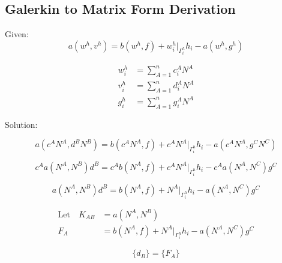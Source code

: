 \documentclass[a4paper, 12pt]{article}
\begin{document}
\newpage
\subsection{Galerkin to Matrix Form Derivation} \label{sec:MatrixDer}

Given:
\begin{equation*}
a(w^{h} , v^{h})
 = b(w^{h} , f) 
  + w^{h}_{i}\Big|_{\Gamma^{h}_{i}} h_{i} 
  - a(w^{h} , g^{h})
\end{equation*}

\begin{align*}
w^{h}_i &= \sum_{A=1}^{n} c^{A}_i N^{A}  \\
v^{h}_i &= \sum_{A=1}^{n} d^{A}_i N^{A}  \\
g^{h}_i &=  \sum_{A=1}^{n} g^{A}_i N^{A}
\end{align*}

\noindent
Solution:

\begin{equation*}
a(c^{A} N^{A}, d^{B} N^{B})
 = b( c^{A} N^{A} , f) 
  + c^{A} N^{A}\Big|_{\Gamma^{h}_{i}} h_{i} 
  - a( c^{A} N^{A}, g^{C} N^{C})
\end{equation*}

\begin{equation*}
c^{A} a(N^{A}, N^{B})d^{B} 
 = c^{A} b( N^{A} , f) 
  + c^{A} N^{A}\Big|_{\Gamma^{h}_{i}} h_{i} 
  - c^{A}a( N^{A}, N^{C})g^{C} 
\end{equation*}

\begin{equation*}
a(N^{A}, N^{B})d^{B} 
 = b( N^{A} , f) 
  + N^{A}\Big|_{\Gamma^{h}_{i}} h_{i} 
  - a( N^{A}, N^{C})g^{C} 
\end{equation*}

\begin{align*}
\text{Let}\quad K_{AB} &= a(N^{A}, N^{B}) \\
F_A &= b( N^{A} , f) 
  + N^{A}\Big|_{\Gamma^{h}_{i}} h_{i} 
  - a( N^{A}, N^{C})g^{C} 
\end{align*}

\begin{equation*}
[ K_{AB} ] \{ d_B \} = \{ F_A \} 
\end{equation*} 
\end{document}
